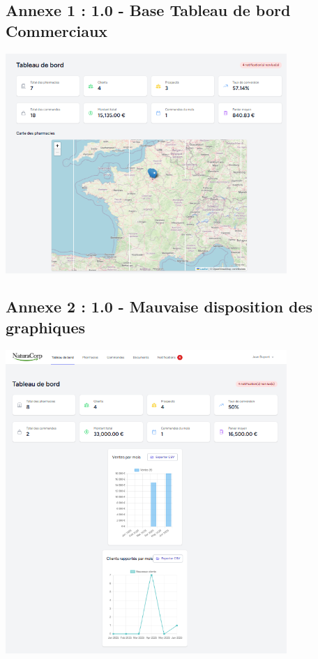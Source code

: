 \documentclass[a4paper,12pt]{report}
\begin{document}
\subsection*{Annexe 1 : 1.0 - Base Tableau de bord Commerciaux}
\vspace{0.5cm}
\includegraphics[width=0.8\textwidth]{Screens/1.0 - Base Tableau de bord Commerciaux.png}
\vspace{1cm}

\subsection*{Annexe 2 : 1.0 - Mauvaise disposition des graphiques}
\vspace{0.5cm}
\includegraphics[width=0.8\textwidth]{Screens/1.0 - Mauvaise disposition des graphiques.png}
\vspace{1cm}
\end{document}
